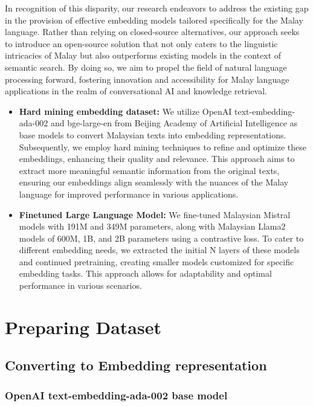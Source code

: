 \documentclass[preprint]{article}
\begin{document}
In recognition of this disparity, our research endeavors to address the existing gap in the provision of effective embedding models tailored specifically for the Malay language. Rather than relying on closed-source alternatives, our approach seeks to introduce an open-source solution that not only caters to the linguistic intricacies of Malay but also outperforms existing models in the context of semantic search. By doing so, we aim to propel the field of natural language processing forward, fostering innovation and accessibility for Malay language applications in the realm of conversational AI and knowledge retrieval.

\begin{itemize}
  \item \textbf{Hard mining embedding dataset:} We utilize OpenAI text-embedding-ada-002 and bge-large-en \cite{bge_embedding} from Beijing Academy of Artificial Intelligence as base models to convert Malaysian texts into embedding representations. Subsequently, we employ hard mining techniques to refine and optimize these embeddings, enhancing their quality and relevance. This approach aims to extract more meaningful semantic information from the original texts, ensuring our embeddings align seamlessly with the nuances of the Malay language for improved performance in various applications.

  \item \textbf{Finetuned Large Language Model:} We fine-tuned Malaysian Mistral \cite{zolkepli2024large} models with 191M and 349M parameters, along with Malaysian Llama2 models of 600M, 1B, and 2B parameters using a contrastive loss. To cater to different embedding needs, we extracted the initial N layers of these models and continued pretraining, creating smaller models customized for specific embedding tasks. This approach allows for adaptability and optimal performance in various scenarios.
\end{itemize}

\section{Preparing Dataset}

\subsection{Converting to Embedding representation}

\subsubsection{OpenAI text-embedding-ada-002 base model}
\end{document}
